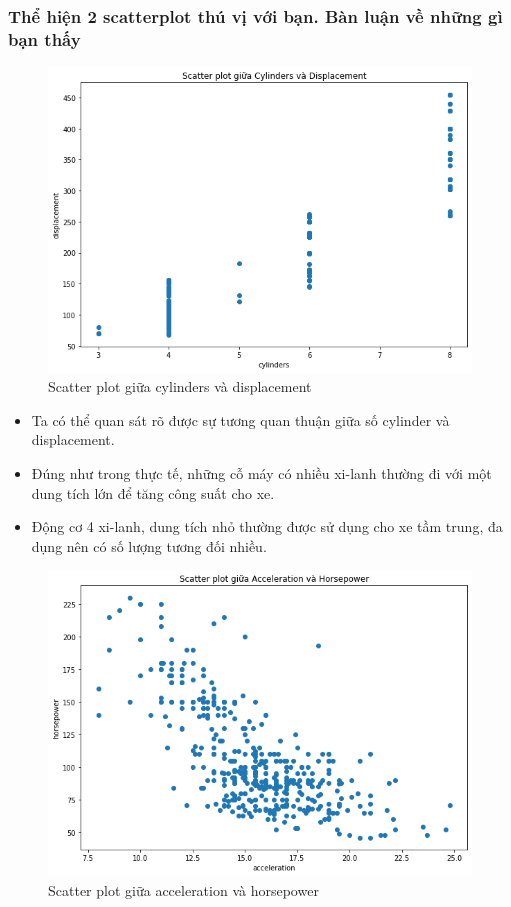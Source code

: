 \documentclass[a4paper, 12pt]{article}
\begin{document}
    \subsubsection{Thể hiện 2 scatterplot thú vị với bạn. Bàn luận về những gì bạn thấy}
        \begin{figure}[H]
            \centering
                \includegraphics[scale=0.8]{img/cylinders-displacement.png}
                \caption{Scatter plot giữa  cylinders và displacement}
        \end{figure}
        
        \begin{itemize}
            \item Ta có thể quan sát rõ được sự tương quan thuận giữa số cylinder và displacement.
            \item Đúng như trong thực tế, những cỗ máy có nhiều xi-lanh thường đi với một dung tích lớn để tăng công suất cho xe.
            \item Động cơ 4 xi-lanh, dung tích nhỏ thường được sử dụng cho xe tầm trung, đa dụng nên có số lượng tương đối nhiều.
        \end{itemize}

        \begin{figure}[H]
            \centering
                \includegraphics[scale=0.8]{img/acceleration-horsepower.png}
                \caption{Scatter plot giữa  acceleration và horsepower}
        \end{figure}
        
\end{document}
